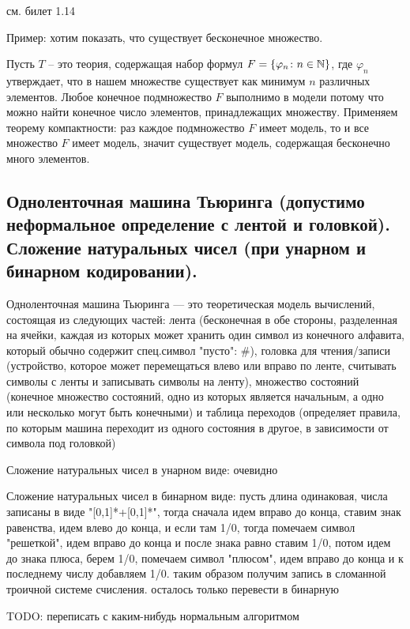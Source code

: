 \documentclass[a4paper, 10pt]{article}
\begin{document}
см. билет 1.14

Пример: хотим показать, что существует бесконечное множество.

Пусть $T$ -- это теория, содержащая набор формул $F=\{\varphi_n \colon n \in \mathbb{N}\}$, где $\varphi_n$ утверждает, что в нашем множестве существует как минимум $n$ различных элементов. Любое конечное подмножество $F$ выполнимо в модели потому что можно найти конечное число элементов, принадлежащих множеству. Применяем теорему компактности: раз каждое подмножество $F$ имеет модель, то и все множество $F$ имеет модель, значит существует модель, содержащая бесконечно много элементов.

\subsection{Одноленточная машина Тьюринга (допустимо неформальное определение с лентой и головкой). Сложение натуральных чисел (при унарном и бинарном кодировании).}

Одноленточная машина Тьюринга — это теоретическая модель вычислений, состоящая из следующих частей: лента (бесконечная в обе стороны, разделенная на ячейки, каждая из которых может хранить один символ из конечного алфавита, который обычно содержит спец.символ "пусто": $\#$), головка для чтения/записи (устройство, которое может перемещаться влево или вправо по ленте, считывать символы с ленты и записывать символы на ленту), множество состояний (конечное множество состояний, одно из которых является начальным, а одно или несколько могут быть конечными) и таблица переходов (определяет правила, по которым машина переходит из одного состояния в другое, в зависимости от символа под головкой)

Сложение натуральных чисел в унарном виде: очевидно

Сложение натуральных чисел в бинарном виде: пусть длина одинаковая, числа записаны в виде "[0,1]*+[0,1]*", тогда сначала идем вправо до конца, ставим знак равенства, идем влево до конца, и если там 1/0, тогда помечаем символ "решеткой", идем вправо до конца и после знака равно ставим 1/0, потом идем до знака плюса, берем 1/0, помечаем символ "плюсом", идем вправо до конца и к последнему числу добавляем 1/0. таким образом получим запись в сломанной троичной системе счисления. осталось только перевести в бинарную

TODO: переписать с каким-нибудь нормальным алгоритмом
\end{document}
